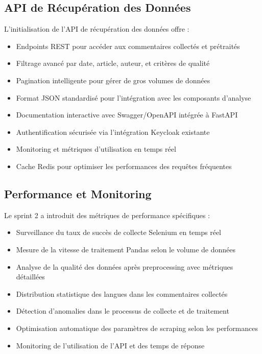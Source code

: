 \subsection{API de Récupération des Données}

L'initialisation de l'API de récupération des données offre :
\begin{itemize}
    \item Endpoints REST pour accéder aux commentaires collectés et prétraités
    \item Filtrage avancé par date, article, auteur, et critères de qualité
    \item Pagination intelligente pour gérer de gros volumes de données
    \item Format JSON standardisé pour l'intégration avec les composants d'analyse
    \item Documentation interactive avec Swagger/OpenAPI intégrée à FastAPI
    \item Authentification sécurisée via l'intégration Keycloak existante
    \item Monitoring et métriques d'utilisation en temps réel
    \item Cache Redis pour optimiser les performances des requêtes fréquentes
\end{itemize}

\subsection{Performance et Monitoring}

Le sprint 2 a introduit des métriques de performance spécifiques :
\begin{itemize}
    \item Surveillance du taux de succès de collecte Selenium en temps réel
    \item Mesure de la vitesse de traitement Pandas selon le volume de données
    \item Analyse de la qualité des données après preprocessing avec métriques détaillées
    \item Distribution statistique des langues dans les commentaires collectés
    \item Détection d'anomalies dans le processus de collecte et de traitement
    \item Optimisation automatique des paramètres de scraping selon les performances
    \item Monitoring de l'utilisation de l'API et des temps de réponse
\end{itemize}

